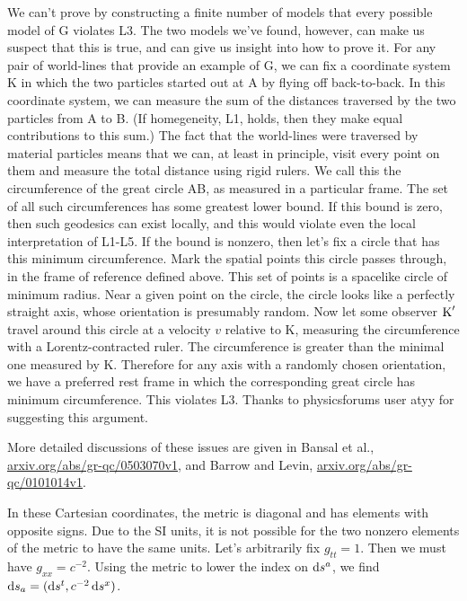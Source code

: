 We can't prove by constructing a finite number of models that every possible model of G violates L3. The two models we've found, however,
can make us suspect that this is true, and can give us insight into how to prove it. For any pair of world-lines that
provide an example of G, we can fix a coordinate system K in which the two particles started out at A by flying off back-to-back.
In this coordinate system, we can measure the sum of the distances traversed by the two particles from A to B. (If homegeneity, L1,
holds, then they make equal contributions to this sum.) The fact that the world-lines were traversed by material particles
means that we can, at least in principle, visit every point on them and measure the total distance using rigid rulers.
We call this the circumference of the great circle AB, as measured in a particular frame.
The set of all such circumferences has some greatest lower bound. If this bound is zero, then such geodesics can exist locally, and
this would violate even the local interpretation of L1-L5. If the bound is nonzero, then let's fix a circle that has
this minimum circumference. Mark the spatial points this circle passes through, in the frame of reference defined above.
This set of points is a spacelike circle of minimum radius. Near a given point on the circle, the circle looks like
a perfectly straight axis, whose orientation is presumably random. Now let some observer $\textup{K}'$ travel around this circle at a velocity
$v$ relative to K, measuring the circumference with a Lorentz-contracted ruler. The circumference is greater than the minimal
one measured by K. Therefore for any axis with a randomly chosen orientation, we have a preferred rest frame in which the
corresponding great circle has minimum circumference. This violates L3. Thanks to physicsforums user atyy for suggesting this
argument.

More detailed discussions of these issues are given in Bansal et al., \url{arxiv.org/abs/gr-qc/0503070v1},
and Barrow and Levin, \url{arxiv.org/abs/gr-qc/0101014v1}.


In these Cartesian coordinates, the metric is diagonal and has elements with opposite signs.
Due to the SI units, it is not possible for the two nonzero elements of the metric to have the
same units. Let's arbitrarily fix $g_{tt}=1$. Then we must have $g_{xx}=c^{-2}$. Using the metric to
lower the index on $\operatorname{d\!} s^a$, we find $\operatorname{d\!} s_a = (\operatorname{d\!} s^t,c^{-2} \operatorname{d\!} s^x)$.


